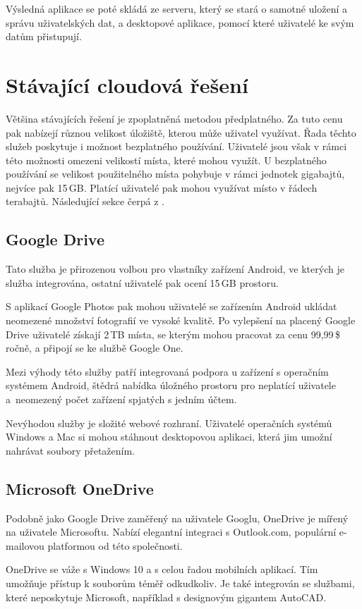 \documentclass[
  glossaries,
]{kidiplom}
\begin{document}
Výsledná aplikace se poté skládá ze serveru, který se stará o samotné uložení a správu uživatelských dat, a desktopové aplikace, pomocí které uživatelé ke svým datům přistupují.

\clearpage
\section{Stávající cloudová řešení}
Většina stávajících řešení je zpoplatněná metodou předplatného. Za tuto cenu pak nabízejí různou velikost úložiště, kterou může uživatel využívat. Řada těchto služeb poskytuje i možnost bezplatného používání. Uživatelé jsou však v rámci této možnosti omezeni velikostí místa, které mohou využít. U bezplatného používání se velikost použitelného místa pohybuje v rámci jednotek gigabajtů, nejvíce pak 15\,GB. Platící uživatelé pak mohou využívat místo v řádech terabajtů. Následující sekce čerpá z \cite{CLOUDSOLUTIONS}.

\subsection{Google Drive}
Tato služba je přirozenou volbou pro vlastníky zařízení Android, ve kterých je služba integrována, ostatní uživatelé pak ocení 15\,GB prostoru.

S aplikací Google Photos pak mohou uživatelé se zařízením Android ukládat neomezené množství fotografií ve vysoké kvalitě. Po vylepšení na placený Google Drive uživatelé získají 2\,TB místa, se kterým mohou pracovat za cenu 99,99\,\$ ročně, a připojí se ke službě Google One.

Mezi výhody této služby patří integrovaná podpora u zařízení s operačním systémem Android, štědrá nabídka úložného prostoru pro neplatící uživatele a~neomezený počet zařízení spjatých s jedním účtem.

Nevýhodou služby je složité webové rozhraní. Uživatelé operačních systémů Windows a Mac si mohou stáhnout desktopovou aplikaci, která jim umožní nahrávat soubory přetažením.

\subsection{Microsoft OneDrive}
Podobně jako Google Drive zaměřený na uživatele Googlu, OneDrive je mířený na uživatele Microsoftu. Nabízí elegantní integraci s Outlook.com, populární e-mailovou platformou od této společnosti.

OneDrive se váže s Windows 10 a s celou řadou mobilních aplikací. Tím umožňuje přístup k souborům téměř odkudkoliv. Je také integrován se službami, které neposkytuje Microsoft, například s designovým gigantem AutoCAD.
\end{document}
